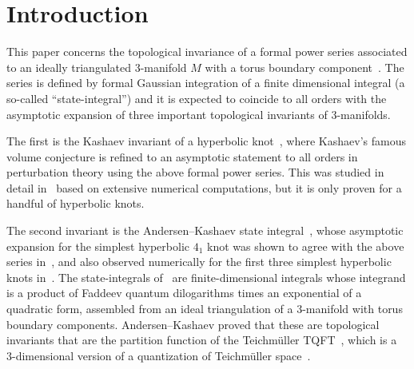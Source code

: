 \documentclass[12pt,reqno]{amsart}
\theoremstyle{definition}
\renewcommand{\=}{\;=\;}
\begin{document}
\maketitle

{\footnotesize
\tableofcontents
}


\section{Introduction}
\label{sec.intro}

This paper concerns the topological invariance of a formal power series associated
to an ideally triangulated 3-manifold $M$ with a torus boundary component~\cite{DG}. 
The series is defined by formal Gaussian integration of a finite dimensional integral
(a so-called ``state-integral'')
and it is expected to coincide to all orders with the asymptotic expansion of
three important topological invariants of 3-manifolds.

The first is the Kashaev invariant of a hyperbolic
knot~\cite{K95}, where Kashaev's famous volume conjecture is refined to an
asymptotic statement to all orders in perturbation theory using the above formal
power series. This was studied in detail in~\cite{GZ:kashaev} based on extensive
numerical computations, but it is only proven for a handful of hyperbolic knots.

The second invariant is the Andersen--Kashaev state integral~\cite{AK}, whose
asymptotic expansion for the simplest hyperbolic $4_1$ knot was shown to agree with
the above series in~\cite[Sec.12]{AK}, and also observed numerically for the
first three simplest hyperbolic knots in~\cite{GZ:qseries}.
The state-integrals of~\cite{AK} are finite-dimensional integrals whose integrand
is a product of Faddeev quantum dilogarithms times an exponential of a quadratic
form, assembled from an ideal triangulation of a 3-manifold with torus boundary
components. Andersen--Kashaev proved that these are topological invariants that
are the partition function of the Teichm\"uller TQFT~\cite{AK,AK:teichmuller},
which is a 3-dimensional version of a quantization of Teichm\"uller
space~\cite{Kashaev:quantization, Fock-Chekhov}. 
\end{document}
